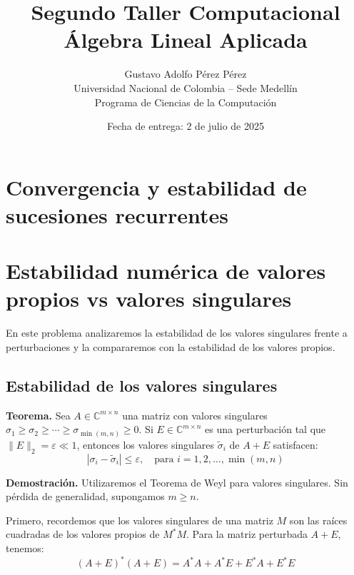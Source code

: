 \documentclass[12pt]{article}
\title{Segundo Taller Computacional\\\vspace{0.3em}Álgebra Lineal Aplicada}
\author{Gustavo Adolfo Pérez Pérez\\Universidad Nacional de Colombia -- Sede Medellín\\Programa de Ciencias de la Computación}
\date{Fecha de entrega: 2 de julio de 2025}
\begin{document}
\maketitle
\tableofcontents
\newpage

\section{Convergencia y estabilidad de sucesiones recurrentes}


\vspace{2cm}

\section{Estabilidad numérica de valores propios vs valores singulares}

En este problema analizaremos la estabilidad de los valores singulares frente a perturbaciones y la compararemos con la estabilidad de los valores propios.

\subsection{Estabilidad de los valores singulares}

\textbf{Teorema.} Sea $A \in \mathbb{C}^{m \times n}$ una matriz con valores singulares $\sigma_1 \geq \sigma_2 \geq \cdots \geq \sigma_{\min(m,n)} \geq 0$. Si $E \in \mathbb{C}^{m \times n}$ es una perturbación tal que $\|E\|_2 = \varepsilon \ll 1$, entonces los valores singulares $\tilde{\sigma}_i$ de $A + E$ satisfacen:
\[
|\sigma_i - \tilde{\sigma}_i| \leq \varepsilon, \quad \text{para } i = 1, 2, \ldots, \min(m,n)
\]

\textbf{Demostración.} Utilizaremos el Teorema de Weyl para valores singulares. Sin pérdida de generalidad, supongamos $m \geq n$.

Primero, recordemos que los valores singulares de una matriz $M$ son las raíces cuadradas de los valores propios de $M^*M$. Para la matriz perturbada $A + E$, tenemos:
\[
(A + E)^*(A + E) = A^*A + A^*E + E^*A + E^*E
\]
\end{document}
